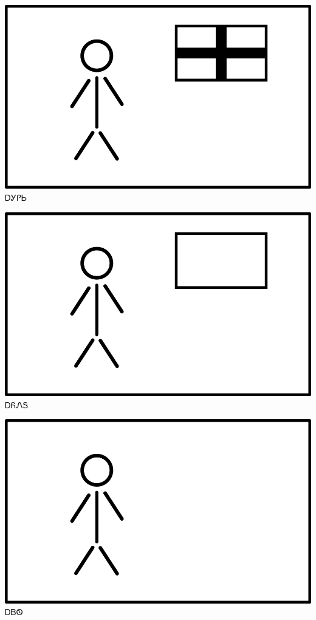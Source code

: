 \documentclass[avery5371]{flashcards}%
\begin{document}
    \begin{flashcard}{
        \includegraphics[width=0.95\columnwidth,height=.51\columnwidth,keepaspectratio]{../artwork/flags/agilisi-flag}
    }
        \Huge ᎠᎩᎵᏏ
    \end{flashcard}

    \begin{flashcard}{
        \includegraphics[width=0.95\columnwidth,height=.51\columnwidth,keepaspectratio]{../artwork/flags/ayonega-flag}
    }
        \Huge ᎠᏲᏁᎦ
    \end{flashcard}

    \begin{flashcard}{
        \includegraphics[width=0.95\columnwidth,height=.51\columnwidth,keepaspectratio]{../artwork/flags/ayvwi-no-flag}
    }
        \Huge ᎠᏴᏫ
    \end{flashcard}
\end{document}
